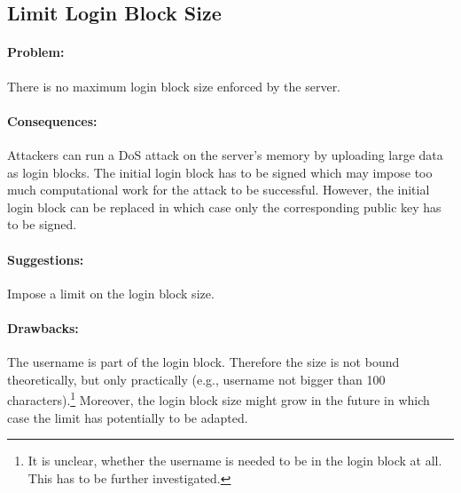 \subsection{Limit Login Block Size}

\paragraph{Problem:}
There is no maximum login block size enforced by the server.

\paragraph{Consequences:}
Attackers can run a \ac{DoS} attack on the server's memory by uploading large data as login blocks.
The initial login block has to be signed which may impose too much computational work for the attack to be successful.
However, the initial login block can be replaced in which case only the corresponding public key has to be signed.

\paragraph{Suggestions:}
Impose a limit on the login block size.

\paragraph{Drawbacks:}
The username is part of the login block. Therefore the size is not bound theoretically, but only practically (e.g., username not bigger than 100 characters).\footnote{It is unclear, whether the username is needed to be in the login block at all. This has to be further investigated.}
Moreover, the login block size might grow in the future in which case the limit has potentially to be adapted.

